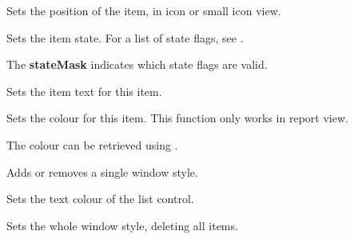 \label{wxlistctrlsetitemposition}


Sets the position of the item, in icon or small icon view.


\label{wxlistctrlsetitemstate}


Sets the item state. For a list of state flags, see .

The {\bf stateMask} indicates which state flags are valid.


\label{wxlistctrlsetitemtext}


Sets the item text for this item.


\label{wxlistctrlsetitemtextcolour}


Sets the colour for this item. This function only works in report view.

The colour can be retrieved using 
.


\label{wxlistctrlsetsinglestyle}


Adds or removes a single window style.


\label{wxlistctrlsettextcolour}


Sets the text colour of the list control.


\label{wxlistctrlsetwindowstyleflag}


Sets the whole window style, deleting all items.

\label{wxlistctrlsortitems}

